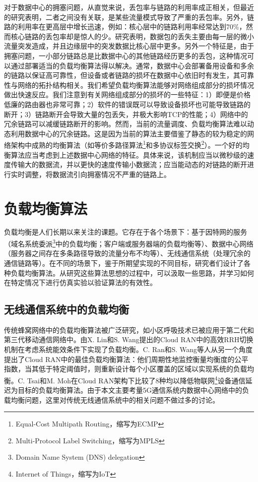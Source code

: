 对于数据中心的拥塞问题，从直觉来说，丢包率与链路的利用率成正相关，但最近的研究表明，二者之间没有关联，是某些流量模式导致了严重的丢包率\cite{zhang2011modeling}。另外，链路的利用率在更高层中增长迅速\cite{benson2010under,benson2010network}，例如：核心层中的链路利用率经常达到70\%，然而核心链路的丢包率却是惊人的少\cite{benson2010under}。研究表明，数据包的丢失主要由每一层的微小流量突发造成，并且边缘层中的突发数据比核心层中更多。另外一个特征是，由于拥塞问题，一小部分链路总是比数据中心的其他链路经历更多的丢包，这种情况可以通过部署适当的负载均衡算法得以解决。通常，数据中心会部署备用设备和多余的链路以保证高可靠性，但设备或者链路的损坏在数据中心依旧时有发生，其可靠性与网络的拓扑结构相关。我们希望负载均衡算法能够对网络组成部分的损坏情况做出快速反应。我们注意到有关网络组成部分的损坏的一些特征：1）即便是价格低廉的路由器也非常可靠；2）软件的错误既可以导致设备损坏也可能导致链路的断开；3）链路断开会导致大量的包丢失，并极大影响TCP的性能；4）网络中的冗余链路可以减缓链路断开的影响。然而，当前的流量调度、负载均衡算法难以动态利用数据中心的冗余链路。这是因为当前的算法主要借鉴了静态的较为稳定的网络架构中成熟的均衡算法（如等价多路径算法\footnote{Equal-Cost Multipath Routing，缩写为ECMP}和多协议标签交换\footnote{Multi-Protocol Label Switching，缩写为MPLS}）。一个好的均衡算法应当考虑到上述数据中心网络的特征。具体来说，该机制应当以微秒级的速度传输大的数据流，并以更快的速度传输小数据流；应当能动态的对链路的断开进行实时调整，将数据流引向拥塞情况不严重的链路上。

\section{负载均衡算法}

负载均衡是人们长期以来关注的课题。它存在于各个场景下：基于因特网的服务\cite{hong2006dns}（域名系统委派\footnote{Domain Name System (DNS) delegation}中的负载均衡；客户端或服务器端的负载均衡等）、数据中心网络\cite{alizadeh2014CONGA}（服务器之间存在多条路径导致的流量分布不均等）、无线通信系统（处理冗余的通信链路等）。在不同的场景下，鉴于所期望实现的不同目标，研究者们设计了各种负载均衡算法。从研究这些算法思想的过程中，可以汲取一些思路，并学习如何在特定情况下进行仿真实验以验证算法的有效性。
\subsection{无线通信系统中的负载均衡}
传统蜂窝网络中的负载均衡算法被广泛研究，如小区呼吸技术\cite{niu2010cell}已被应用于第二代和第三代移动通信网络中。由X. Lin和S. Wang提出的Cloud RAN中的高效RRH切换机制在考虑系统能效条件下\cite{lin2010efficient}实现了负载均衡。C. Ran和S. Wang等人从另一个角度提出了Cloud RAN中的最佳负载均衡算法：他们周期性地监控衡量均衡度的公平指数，当其低于特定阈值时，则重新设计每个小区覆盖的区域以实现系统的负载均衡\cite{ran2015optimal}。C. Tsai和M. Moh在Cloud RAN架构下比较了8种均以降低物联网\footnote{Internet of Things，缩写为IoT}设备通信延迟为目标\cite{tsai2017load}的负载均衡算法。由于本文主要考量5G通信系统内数据中心网络中的负载均衡问题，这里对传统无线通信系统中的相关问题不做过多的讨论。

